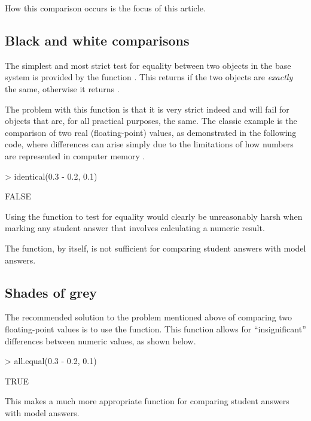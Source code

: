 How this comparison occurs is the focus of this article.

\subsection*{Black and white comparisons}

The simplest and most strict test for equality between two objects
in the base \R{} system \citep{R}
is provided by the function .  This returns 
 if the two objects are \emph{exactly} the same, otherwise
it returns .

The problem with this function is that it is very strict indeed and
will fail for objects that are, for all practical purposes, the same.
The classic example is the comparison of two real (floating-point) values,
as demonstrated in the following code, where differences can arise
simply due to the limitations of how numbers are represented in 
computer memory \citep[see R FAQ 7.31,][]{rfaq}.

\begin{Schunk}
\begin{Sinput}
> identical(0.3 - 0.2, 0.1)
\end{Sinput}
\begin{Soutput}
[1] FALSE
\end{Soutput}
\end{Schunk}
Using the function to test for equality would 
clearly be unreasonably harsh when marking any student answer that
involves calculating a numeric result.

The  function, by itself, is not sufficient for
comparing student answers with model answers.

\subsection*{Shades of grey}

The recommended solution to the problem mentioned above of comparing two 
floating-point values is to use the  function.
This function allows for ``insignificant'' differences between
numeric values, as shown below.

\begin{Schunk}
\begin{Sinput}
> all.equal(0.3 - 0.2, 0.1)
\end{Sinput}
\begin{Soutput}
[1] TRUE
\end{Soutput}
\end{Schunk}
This makes  a much more appropriate function
for comparing student answers with model answers.

